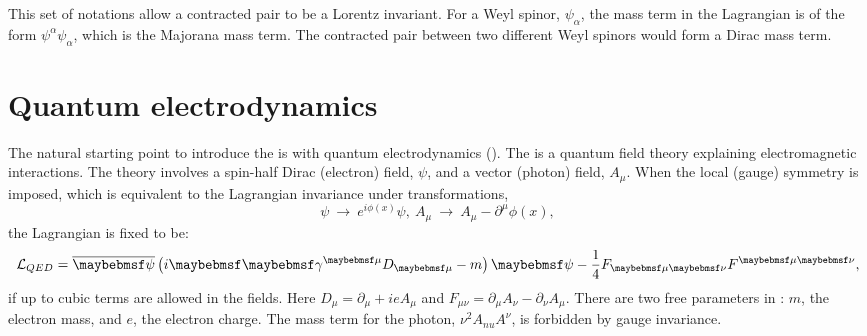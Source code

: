 This set of notations allow a contracted pair to be a Lorentz invariant. For a Weyl spinor, $\psi_\alpha$, the mass term in the Lagrangian is of the form $\psi^{\alpha}\psi_\alpha$, which is the Majorana mass term. The contracted pair between two different Weyl spinors would form a Dirac mass term.


\section{Quantum electrodynamics}

The natural starting point to introduce the \SM is with quantum electrodynamics (\QED). The \QED is a quantum field theory explaining electromagnetic interactions. The theory involves a spin-half Dirac (electron) field, $\psi$, and a vector (photon) field, $A_{\mu}$. When the local (gauge) symmetry is imposed, which is equivalent to the Lagrangian invariance under transformations,
\begin{equation}
\psi\ \to\ e^{i\phi(x)}\psi,\ A_{\mu}\ \to\ A_{\mu} - \partial^{\mu}\phi(x),
\end{equation}
the Lagrangian is fixed to be:
\begin{equation}
\Lagr_{QED} = \overline{\psi} \left( i\Dstroke - m \right)\psi -  \frac{1}{4}F_{\mu\nu}F^{\mu\nu},
\end{equation}
if up to cubic terms are allowed in the fields. Here $D_{\mu} = \partial_{\mu} + ieA_{\mu}$ and $F_{\mu\nu} = \partial_{\mu}A_{\nu} - \partial_{\nu}A_{\mu}$. There are two free parameters in \QED: $m$, the electron mass, and $e$, the electron charge. The mass term for the photon, $\nu^{2}A_{nu}A^{\nu}$, is forbidden by gauge invariance.

